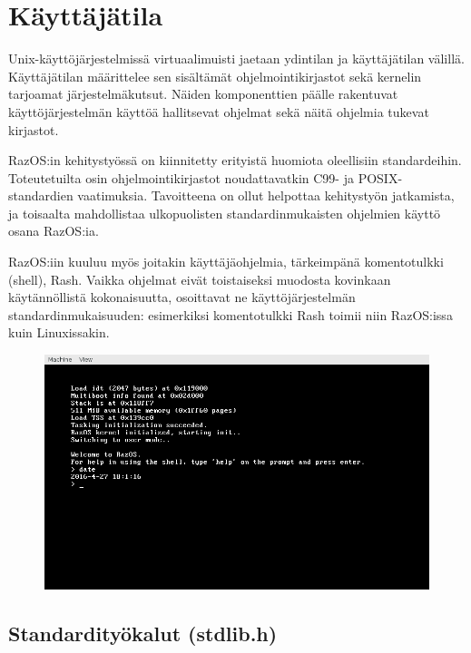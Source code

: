 \chapter{Käyttäjätila}
\label{Käyttäjätila}

Unix-käyttöjärjestelmissä virtuaalimuisti jaetaan ydintilan ja käyttäjätilan välillä. Käyttäjätilan määrittelee sen sisältämät ohjelmointikirjastot sekä kernelin tarjoamat järjestelmäkutsut. Näiden komponenttien päälle rakentuvat käyttöjärjestelmän käyttöä hallitsevat ohjelmat sekä näitä ohjelmia tukevat kirjastot.

\par

RazOS:in kehitystyössä on kiinnitetty erityistä huomiota oleellisiin standardeihin. Toteutetuilta osin ohjelmointikirjastot noudattavatkin C99- ja POSIX- standardien vaatimuksia. Tavoitteena on ollut helpottaa kehitystyön jatkamista, ja toisaalta mahdollistaa ulkopuolisten standardinmukaisten ohjelmien käyttö osana RazOS:ia.

\par

RazOS:iin kuuluu myös joitakin käyttäjäohjelmia, tärkeimpänä komentotulkki (shell), Rash. Vaikka ohjelmat eivät toistaiseksi muodosta kovinkaan käytännöllistä kokonaisuutta, osoittavat ne käyttöjärjestelmän standardinmukaisuuden: esimerkiksi komentotulkki Rash toimii niin RazOS:issa kuin Linuxissakin.

\begin{figure}[H]
\centering
\includegraphics[]{../figures/rash.png}
\label{fig:rash.png}
\end{figure}

\section{Standardityökalut (stdlib.h)}

